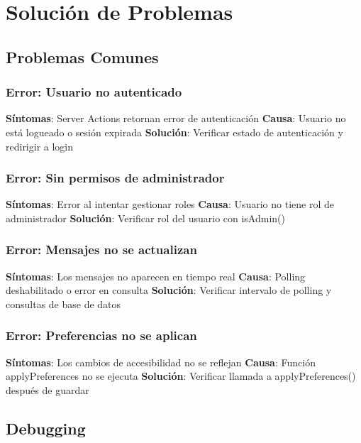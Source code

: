 \documentclass[12pt,a4paper]{article}
\begin{document}
\section{Solución de Problemas}

\subsection{Problemas Comunes}

\subsubsection{Error: Usuario no autenticado}

\textbf{Síntomas}: Server Actions retornan error de autenticación
\textbf{Causa}: Usuario no está logueado o sesión expirada
\textbf{Solución}: Verificar estado de autenticación y redirigir a login

\subsubsection{Error: Sin permisos de administrador}

\textbf{Síntomas}: Error al intentar gestionar roles
\textbf{Causa}: Usuario no tiene rol de administrador
\textbf{Solución}: Verificar rol del usuario con isAdmin()

\subsubsection{Error: Mensajes no se actualizan}

\textbf{Síntomas}: Los mensajes no aparecen en tiempo real
\textbf{Causa}: Polling deshabilitado o error en consulta
\textbf{Solución}: Verificar intervalo de polling y consultas de base de datos

\subsubsection{Error: Preferencias no se aplican}

\textbf{Síntomas}: Los cambios de accesibilidad no se reflejan
\textbf{Causa}: Función applyPreferences no se ejecuta
\textbf{Solución}: Verificar llamada a applyPreferences() después de guardar

\subsection{Debugging}
\end{document}
